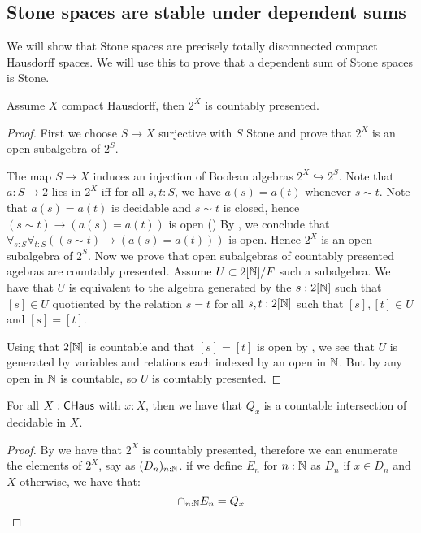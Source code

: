 \subsection{Stone spaces are stable under dependent sums}
We will show that Stone spaces are precisely totally disconnected compact Hausdorff spaces. 
We will use this to prove that a dependent sum of Stone spaces is Stone.

\begin{lemma}\label{AlgebraCompactHausdorffCountablyPresented}
Assume $X$ compact Hausdorff, then $2^X$ is countably presented.
\end{lemma}

\begin{proof}
First we choose $S\to X$ surjective with $S$ Stone and prove that $2^X$ is an open subalgebra of $2^S$.

 The map $S\to X$ induces an injection of Boolean algebras $2^X \hookrightarrow 2^S$.
  Note that $a:S\to 2$ lies in $2^X$ iff for all $s,t:S$, we have $a(s) = a(t)$ whenever $s\sim t$.
  Note that $a(s) = a(t)$ is decidable and $s\sim t$ is closed, hence 
  $(s\sim t) \to (a(s) = a(t))$ is open ()
  By , we conclude that 
  $\forall_{s:S} \forall_{t:S} ((s\sim t) \to (a(s) = a(t)))$ is open. 
  Hence $2^X$ is an open subalgebra of $2^S$. 
Now we prove that open subalgebras of countably presented agebras are countably presented. Assume $U\subset 2[\mathbb{N}] / F$ such a subalgebra. We have that $U$ is equivalent to the algebra generated by the $s:2[\mathbb{N}]$ such that $[s]\in U$ quotiented by the relation $s=t$ for all $s,t:2[\mathbb{N}]$ such that $[s],[t]\in U$ and $[s]=[t]$.

Using that $2[\mathbb{N}]$ is countable and that $[s]=[t]$ is open by , we see that $U$ is generated by variables and relations each indexed by an open in $\mathbb{N}$. But by  any open in $\mathbb{N}$ is countable, so $U$ is countably presented.
\end{proof}

\begin{lemma}\label{ConnectedComponentClosedInCompactHausdorff}
For all $X:\mathsf{CHaus}$ with $x:X$, then we have that $Q_x$ is a countable intersection of decidable in $X$.
\end{lemma}

\begin{proof}
By  we have that $2^X$ is countably presented, therefore we can enumerate the elements of $2^X$, say as $(D_n)_{n:\mathbb{N}}$. if we define $E_n$ for $n:\mathbb{N}$ as $D_n$ if $x\in D_n$ and $X$ otherwise, we have that:
$$\cap_{n:\mathbb{N}}E_n = Q_x$$
\end{proof}

